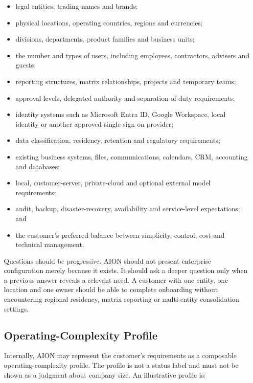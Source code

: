 \begin{itemize}
  \item legal entities, trading names and brands;
  \item physical locations, operating countries, regions and currencies;
  \item divisions, departments, product families and business units;
  \item the number and types of users, including employees, contractors, advisers and guests;
  \item reporting structures, matrix relationships, projects and temporary teams;
  \item approval levels, delegated authority and separation-of-duty requirements;
  \item identity systems such as Microsoft Entra ID, Google Workspace, local identity or another
        approved single-sign-on provider;
  \item data classification, residency, retention and regulatory requirements;
  \item existing business systems, files, communications, calendars, CRM, accounting and databases;
  \item local, customer-server, private-cloud and optional external model requirements;
  \item audit, backup, disaster-recovery, availability and service-level expectations; and
  \item the customer's preferred balance between simplicity, control, cost and technical management.
\end{itemize}

Questions should be progressive.  AION should not present enterprise configuration merely because
it exists.  It should ask a deeper question only when a previous answer reveals a relevant need.  A
customer with one entity, one location and one owner should be able to complete onboarding without
encountering regional residency, matrix reporting or multi-entity consolidation settings.

\subsection{Operating-Complexity Profile}

Internally, AION may represent the customer's requirements as a composable operating-complexity
profile.  The profile is not a status label and must not be shown as a judgment about company size.
An illustrative profile is:

